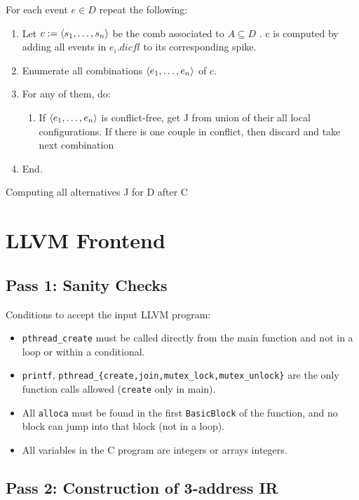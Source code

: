 \documentclass{llncs}
\begin{document}
\begin{algorithm}
\noindent
For each event $e \in D$ repeat the following:
\begin{enumerate}
\item
	Let $c \mathrel{:=} \langle s_1, \ldots, s_n\rangle$ be the comb associated to $A \subseteq D$ . 
	c is computed by adding all events in $e_i.dicfl$ to its corresponding spike.
\item
	Enumerate all combinations $\langle e_1, \ldots, e_n\rangle$ of $c$.
\item
	For any of them, do:
	\begin{enumerate}
	\item
    	If $\langle e_1, \ldots, e_n\rangle$ is conflict-free, get J from union of their all local configurations.
	    If there is one couple in conflict, then discard and take next combination
	\end{enumerate}
\item End.
\end{enumerate}
\caption{Computing all alternatives J for D after C}
\label{a:alter}
\end{algorithm}


\section{LLVM Frontend}

\subsection*{Pass 1: Sanity Checks}

Conditions to accept the input LLVM program:

\begin{itemize}
\item
  \verb!pthread_create! must be called directly from the main function and not
  in a loop or within a conditional.
\item
  \verb!printf!,
  \verb!pthread_{create,join,mutex_lock,mutex_unlock}! are the only function calls
  allowed (\verb!create! only in main).
\item
  All \verb!alloca! must be found in the first \verb!BasicBlock! of the
  function, and no block can jump into that block (not in a loop).
\item
  All variables in the C program are integers or arrays integers.
\end{itemize}

\subsection*{Pass 2: Construction of 3-address IR}
\end{document}
